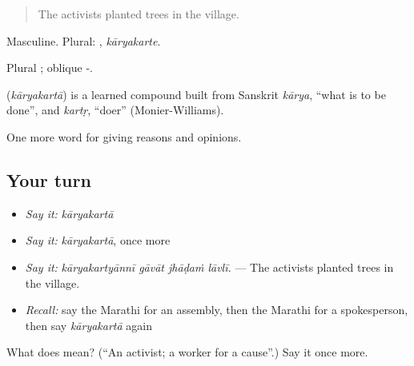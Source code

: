 \begin{quote}
The activists planted trees in the village.
\end{quote}

Masculine. Plural: , \emph{kāryakarte}.

Plural ; oblique -.

\begin{cousinweb}
\textbf{} (\emph{kāryakartā}) is a learned compound built from Sanskrit \emph{kārya}, \textquotedblleft{}what is to be done\textquotedblright{}, and \emph{kartṛ}, \textquotedblleft{}doer\textquotedblright{} (Monier-Williams).
\end{cousinweb}

\begin{grammarlens}[title={What you've built}]
One more word for giving reasons and opinions.
\end{grammarlens}

\subsection*{Your turn}
\begin{itemize}
\raggedright
  \item \emph{Say it:} \emph{kāryakartā}
  \item \emph{Say it:} \emph{kāryakartā}, once more
  \item \emph{Say it:} \emph{kāryakartyānnī gāvāt jhāḍaṁ lāvlī.} — The activists planted trees in the village.
  \item \emph{Recall:} say the Marathi for an assembly, then the Marathi for a spokesperson, then say \emph{kāryakartā} again
\end{itemize}

\begin{tcolorbox}[breakable,colback=teal!4,colframe=teal!35!black,title={Before you move on}]
What does  mean? (\textquotedblleft{}An activist; a worker for a cause\textquotedblright{}.) Say it once more.
\end{tcolorbox}

